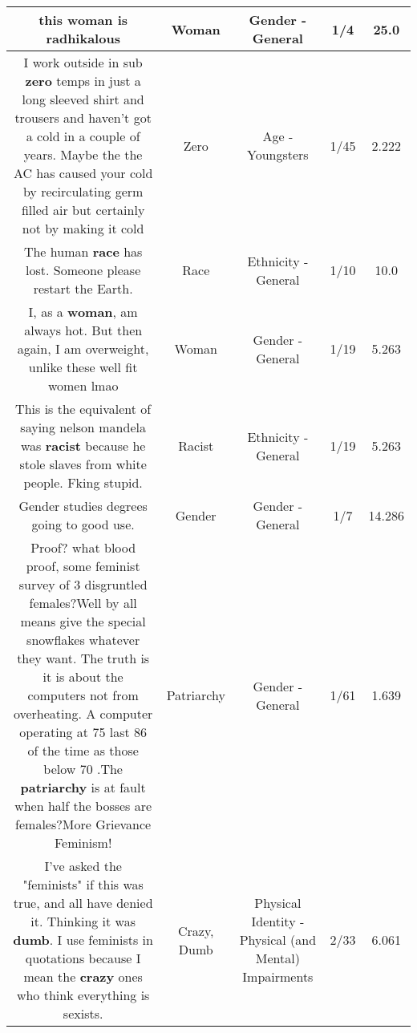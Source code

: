 \documentclass[11pt]{article}
\newlength\mylength
\begin{document}
\begin{center}
\begin{longtable}{|C{.65\mylength}|C{.30\mylength}|C{.12\mylength}|C{.12\mylength}|C{.12\mylength}|}
  \small this \textbf{woman} is radhikalous\normalsize   & Woman & Gender - General & 1/4 & 25.0 \\  \hline
  \small I work outside in sub \textbf{zero} temps in just a long sleeved shirt and trousers and haven't got a cold in a couple of years. Maybe the the AC has caused your cold by recirculating germ filled air but certainly not by making it cold\normalsize   & Zero & Age - Youngsters & 1/45 & 2.222 \\  \hline
  \small The human \textbf{race} has lost. Someone please restart the Earth.\normalsize   & Race & Ethnicity - General & 1/10 & 10.0 \\  \hline
  \small I, as a \textbf{woman}, am always hot. But then again, I am overweight, unlike these well fit women lmao\normalsize   & Woman & Gender - General & 1/19 & 5.263 \\  \hline
  \small This is the equivalent of saying nelson mandela was \textbf{racist} because he stole slaves from white people. Fking stupid.\normalsize   & Racist & Ethnicity - General & 1/19 & 5.263 \\  \hline
  \small Gender studies degrees going to good use.\normalsize   & Gender & Gender - General & 1/7 & 14.286 \\  \hline
  \small Proof? what blood proof, some feminist survey of 3 disgruntled females?Well by all means give the special snowflakes whatever they want. The truth is it is about the computers not from overheating.  A computer operating at 75  last 86 of the time as those below 70 .The \textbf{patriarchy} is at fault when half the bosses are females?More Grievance Feminism!\normalsize   & Patriarchy & Gender - General & 1/61 & 1.639 \\  \hline
  \small I've asked the "feminists" if this was true, and all have denied it. Thinking it was \textbf{dumb}. I use feminists in quotations because I mean the \textbf{crazy} ones who think everything is sexists.\normalsize   & Crazy, Dumb & Physical Identity - Physical (and Mental) Impairments & 2/33 & 6.061 \\  \hline

\end{longtable}
\end{center}
\end{document}
